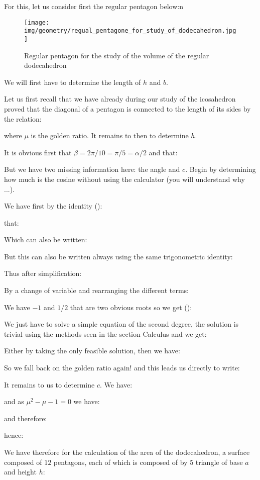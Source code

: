 {	For this, let us consider first the regular pentagon below:n
	\begin{figure}[H]
		\centering
		\texttt{[image: img/geometry/regual\_pentagone\_for\_study\_of\_dodecahedron.jpg]}
		\caption{Regular pentagon for the study of the volume of the regular dodecahedron}
	\end{figure}
	We will first have to determine the length of $h$ and $b$.

	Let us first recall that we have already during our study of the icosahedron proved that the diagonal of a pentagon is connected to the length of its sides by the relation:
	
	where $\mu$ is the golden ratio. It remains to  then to determine $h$.

	It is obvious first that $\beta=2\pi/10=\pi/5=\alpha/2$ and that:
	
	But we have two missing information here: the angle and $c$. Begin by determining how much is the cosine without using the calculator (you will understand why ...).

	We have first by the identity ():
	
	that:
	
	Which can also be written:
	
	But this can also be written always using the same trigonometric identity:
	
	Thus after simplification:
	
	By a change of variable and rearranging the different terms:
	
	We have $-1$ and $1/2$ that are two obvious roots so we get ():
	
	We just have to solve a simple equation of the second degree, the solution is trivial using the methods seen in the section Calculus and we get:
	
	Either by taking the only feasible solution, then we have:
	
	So we fall back on the golden ratio again! and this leads us directly to write:
	
	It remains to us to determine $c$. We have:
	
	and as $\mu^2-\mu-1=0$ we have:
	
	and therefore:
	
	hence:
	
	We have therefore for the calculation of the area of the dodecahedron, a surface composed of $12$ pentagons, each of which is composed of by $5$ triangle of base $a$ and  height $h$:
		
}
